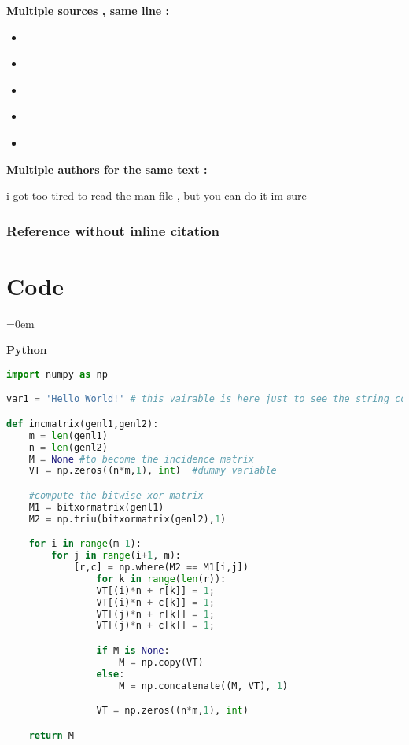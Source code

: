 
\textbf{Multiple sources , same line :}



\begin{itemize}[noitemsep]

	\item \cite{einstein,lipsum}
	\item \citet{einstein,lipsum}
	\item \citep{einstein,lipsum}
	\item \citet*{einstein,lipsum}
	\item \citep*{einstein,lipsum}

\end{itemize}



\textbf{Multiple authors for the same text :}

i got too tired to read the man file , but you can do it im sure

\subsubsectionend


\subsubsection{Reference without inline citation}
\label{sssec:reference_without_inline_citation}

\nocite{lipsum}

\subsubsectionend
\sectionend

\section{Code}
\label{sec:code}
\parindent=0em

\textbf{Python}
\begin{lstlisting}[language=Python]
import numpy as np

var1 = 'Hello World!' # this vairable is here just to see the string color

def incmatrix(genl1,genl2):
	m = len(genl1)
	n = len(genl2)
	M = None #to become the incidence matrix
	VT = np.zeros((n*m,1), int)  #dummy variable

	#compute the bitwise xor matrix
	M1 = bitxormatrix(genl1)
	M2 = np.triu(bitxormatrix(genl2),1) 

	for i in range(m-1):
		for j in range(i+1, m):
			[r,c] = np.where(M2 == M1[i,j])
				for k in range(len(r)):
				VT[(i)*n + r[k]] = 1;
				VT[(i)*n + c[k]] = 1;
				VT[(j)*n + r[k]] = 1;
				VT[(j)*n + c[k]] = 1;

				if M is None:
					M = np.copy(VT)
				else:
					M = np.concatenate((M, VT), 1)

				VT = np.zeros((n*m,1), int)

	return M
\end{lstlisting}

